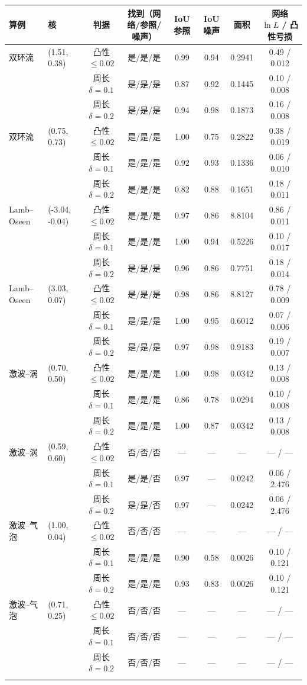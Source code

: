 \begin{tabular}{llcccccc}\toprule 算例 & 核 & 判据 & 找到（网络/参照/噪声） & IoU 参照 & IoU 噪声 & 面积 & 网络 $\ln L$ / 凸性亏损 \\\midrule
双环流 & (1.51, 0.38) & 凸性 $\le 0.02$ & 是/是/是 & 0.99 & 0.94 & 0.2941 & 0.49 / 0.012 \\
 &  & 周长 $\delta=0.1$ & 是/是/是 & 0.87 & 0.92 & 0.1445 & 0.10 / 0.008 \\
 &  & 周长 $\delta=0.2$ & 是/是/是 & 0.94 & 0.98 & 0.1873 & 0.16 / 0.008 \\
\addlinespace[2pt]
双环流 & (0.75, 0.73) & 凸性 $\le 0.02$ & 是/是/是 & 1.00 & 0.75 & 0.2822 & 0.38 / 0.019 \\
 &  & 周长 $\delta=0.1$ & 是/是/是 & 0.92 & 0.93 & 0.1336 & 0.06 / 0.010 \\
 &  & 周长 $\delta=0.2$ & 是/是/是 & 0.82 & 0.88 & 0.1651 & 0.18 / 0.011 \\
\addlinespace[2pt]
Lamb–Oseen & (-3.04, -0.04) & 凸性 $\le 0.02$ & 是/是/是 & 0.97 & 0.86 & 8.8104 & 0.86 / 0.011 \\
 &  & 周长 $\delta=0.1$ & 是/是/是 & 1.00 & 0.94 & 0.5226 & 0.10 / 0.017 \\
 &  & 周长 $\delta=0.2$ & 是/是/是 & 0.96 & 0.86 & 0.7751 & 0.18 / 0.014 \\
\addlinespace[2pt]
Lamb–Oseen & (3.03, 0.07) & 凸性 $\le 0.02$ & 是/是/是 & 0.98 & 0.86 & 8.8127 & 0.78 / 0.009 \\
 &  & 周长 $\delta=0.1$ & 是/是/是 & 1.00 & 0.95 & 0.6012 & 0.07 / 0.006 \\
 &  & 周长 $\delta=0.2$ & 是/是/是 & 0.97 & 0.98 & 0.9183 & 0.19 / 0.007 \\
\addlinespace[2pt]
激波–涡 & (0.70, 0.50) & 凸性 $\le 0.02$ & 是/是/是 & 1.00 & 0.98 & 0.0342 & 0.13 / 0.008 \\
 &  & 周长 $\delta=0.1$ & 是/是/是 & 0.86 & 0.78 & 0.0294 & 0.10 / 0.008 \\
 &  & 周长 $\delta=0.2$ & 是/是/是 & 1.00 & 0.87 & 0.0342 & 0.13 / 0.008 \\
\addlinespace[2pt]
激波–涡 & (0.59, 0.60) & 凸性 $\le 0.02$ & 否/否/否 & — & — & — & — / — \\
 &  & 周长 $\delta=0.1$ & 是/是/否 & 0.97 & — & 0.0242 & 0.06 / 2.476 \\
 &  & 周长 $\delta=0.2$ & 是/是/否 & 0.97 & — & 0.0242 & 0.06 / 2.476 \\
\addlinespace[2pt]
激波–气泡 & (1.00, 0.04) & 凸性 $\le 0.02$ & 否/否/否 & — & — & — & — / — \\
 &  & 周长 $\delta=0.1$ & 是/是/是 & 0.90 & 0.58 & 0.0026 & 0.10 / 0.121 \\
 &  & 周长 $\delta=0.2$ & 是/是/是 & 0.93 & 0.83 & 0.0026 & 0.10 / 0.121 \\
\addlinespace[2pt]
激波–气泡 & (0.71, 0.25) & 凸性 $\le 0.02$ & 否/否/否 & — & — & — & — / — \\
 &  & 周长 $\delta=0.1$ & 否/否/否 & — & — & — & — / — \\
 &  & 周长 $\delta=0.2$ & 否/否/否 & — & — & — & — / — \\
\addlinespace[2pt]
\bottomrule\end{tabular}